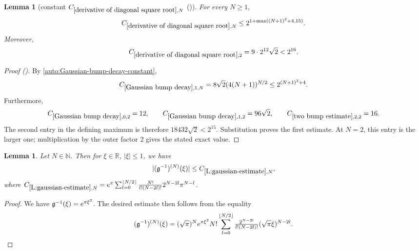 \documentclass[12pt,reqno]{amsart}
\newcommand{\auto}{{({\tiny\faCar})}}
\theoremstyle{plain}
\newtheorem{lemma}[theorem]{Lemma}
\numberwithin{equation}{section}
\theoremstyle{remark}
\newcommand{\uses}[1]{}
\newcommand{\usesdefs}[1]{}
\newcommand{\R}{{\mathbb R}}
\newcommand{\N}{{\mathbb N}}
\begin{document}
\begin{lemma}[constant $C_{\ref{derivative of diagonal square root},N}$ \auto]\label{constant derivative diagonal square root}\uses{Gaussian bump decay,two bump estimate,derivative of diagonal square root}\usesdefs{}
For every $N\ge1$,
\begin{equation}\label{constant derivative diagonal square root bound}
C_{\ref{derivative of diagonal square root},N}
\le2^{1+\max((N+1)^2+4,15)}.
\end{equation}
Moreover,
\begin{equation}\label{auto:constant-derivative-diagonal-square-root-two}
C_{\ref{derivative of diagonal square root},2}=9\cdot2^{12}\sqrt2<2^{16}.
\end{equation}
\end{lemma}
\begin{proof}[Proof \auto]
By \eqref{auto:Gaussian-bump-decay-constant},
\[
C_{\ref{Gaussian bump decay},1,N}
=8\sqrt2(4(N+1))^{N/2}
\le2^{(N+1)^2+4}.
\]
Furthermore,
\[
C_{\ref{Gaussian bump decay},0,2}=12,
\qquad
C_{\ref{Gaussian bump decay},1,2}=96\sqrt2,
\qquad
C_{\ref{two bump estimate},2,2}=16.
\]
The second entry in the defining maximum is therefore $18432\sqrt2<2^{15}$. Substitution proves the first estimate. At $N=2$, this entry is the larger one; multiplication by the outer factor $2$ gives the stated exact value.
\end{proof}


\begin{lemma}\label{L:gaussian-estimate}\uses{}\usesdefs{gaussian}
Let $N\in \N$. Then for $\xi \in \R$, $|\xi|\leq 1$, we have
\begin{equation}\label{auto:inverse-Gaussian-derivative-bound}
|(\mathfrak{g}^{-1})^{(N)}(\xi)| \leq C_{\ref{L:gaussian-estimate},N},
\end{equation}
where $C_{\ref{L:gaussian-estimate},N}=e^{\pi} \sum_{l=0}^{\lfloor N/2 \rfloor} \frac{N!}{l!(N-2l)!} 2^{N-2l} \pi^{N-l}$.
\end{lemma}

\begin{proof}
We have $\mathfrak{g}^{-1}(\xi)=e^{\pi\xi^2}$. The desired estimate then follows from the equality
\[
(\mathfrak{g}^{-1})^{(N)}(\xi)
=(\sqrt{\pi})^{N} e^{\pi  \xi^2} N!\sum_{l=0}^{\lfloor N/2\rfloor} \tfrac{2^{N-2l}}{l!(N -2l)!} (\sqrt{\pi} \xi)^{N-2l}.
\]
\end{proof}
\end{document}
